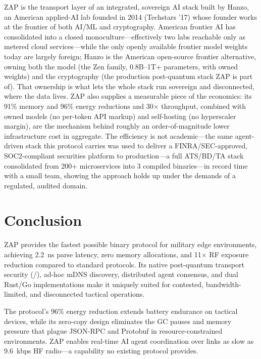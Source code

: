 \documentclass[11pt,letterpaper]{article}
\begin{document}
ZAP is the transport layer of an integrated, sovereign AI stack built by Hanzo, an American applied-AI lab founded in 2014 (Techstars '17) whose founder works at the frontier of both AI/ML and cryptography. American frontier AI has consolidated into a closed monoculture---effectively two labs reachable only as metered cloud services---while the only openly available frontier model weights today are largely foreign; Hanzo is the American open-source frontier alternative, owning both the model (the Zen family, 0.8B--1T+ parameters, with owned weights) and the cryptography (the production post-quantum stack ZAP is part of). That ownership is what lets the whole stack run sovereign and disconnected, where the data lives. ZAP also supplies a measurable piece of the economics: its 91\% memory and 96\% energy reductions and 30$\times$ throughput, combined with owned models (no per-token API markup) and self-hosting (no hyperscaler margin), are the mechanism behind roughly an order-of-magnitude lower infrastructure cost in aggregate. The efficiency is not academic---the same agent-driven stack this protocol carries was used to deliver a FINRA/SEC-approved, SOC2-compliant securities platform to production---a full ATS/BD/TA stack consolidated from 200+ microservices into 3 compiled binaries---in record time with a small team, showing the approach holds up under the demands of a regulated, audited domain.

\section{Conclusion}

ZAP provides the fastest possible binary protocol for military edge environments, achieving 2.2~ns parse latency, zero memory allocations, and 11$\times$ RF exposure reduction compared to standard protocols. Its native post-quantum transport security (/), ad-hoc mDNS discovery, distributed agent consensus, and dual Rust/Go implementations make it uniquely suited for contested, bandwidth-limited, and disconnected tactical operations.

The protocol's 96\% energy reduction extends battery endurance on tactical devices, while its zero-copy design eliminates the GC pauses and memory pressure that plague JSON-RPC and Protobuf in resource-constrained environments. ZAP enables real-time AI agent coordination over links as slow as 9.6~kbps HF radio---a capability no existing protocol provides.
\end{document}
